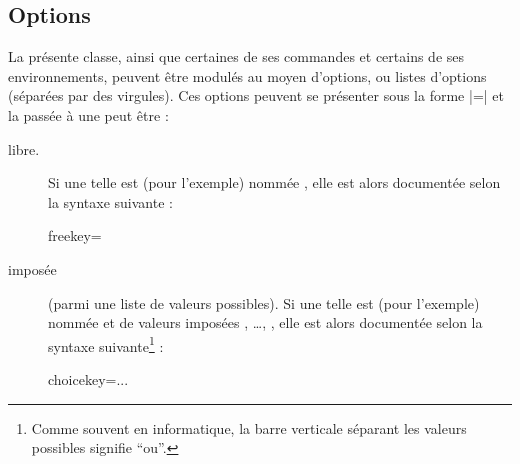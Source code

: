 \documentclass[french,nolocaltoc]{nwejmart}
\newtheorem[title=Fait,style=definition]{fact}
\begin{document}
\subsection{Options}
\label{sec-options}

La présente classe, ainsi que certaines de ses commandes et certains de ses
environnements, peuvent être modulés au moyen d'options, ou listes d'options
(séparées par des virgules). Ces options peuvent se présenter sous la forme
|=| et la  passée à une  peut
être :
\begin{description}
\item[libre.] Si une telle  est (pour l'exemple) nommée
  , elle est alors documentée selon la syntaxe suivante :
  \begin{docKey*}{freekey}{=}{}
  \end{docKey*}
\item[imposée] (parmi une liste de valeurs possibles). Si une telle  est
   (pour l'exemple) nommée  et de valeurs imposées
  , \dots{}, , elle est alors
  documentée selon la syntaxe suivante\footnote{Comme souvent en informatique,
    la barre verticale séparant les valeurs possibles signifie \enquote{ou}.} :
  \begin{docKey*}{choicekey}{=\textbar...\textbar{}}{}
  \end{docKey*}
\end{description}
\end{document}

